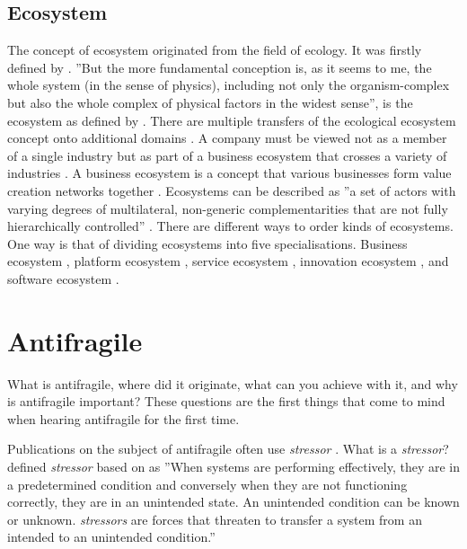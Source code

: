 \subsection{Ecosystem}
\label{sub:tbecosystem}
The concept of ecosystem originated from the field of ecology. It was firstly defined by \textcite[p.~229]{Tansley1935} \parencite[p.~19]{Rich1988}. ''But the more fundamental conception is, as it seems to me, the whole system (in the sense of physics), including not only the organism-complex but also the whole complex of physical factors in the widest sense'', is the ecosystem as defined by \textcite[p.~299]{Tansley1935}. There are multiple transfers of the ecological ecosystem concept onto additional domains \parencite[p.~3]{Guggenberger2020}. A company must be viewed not as a member of a single industry but as part of a business ecosystem that crosses a variety of industries \parencite[p.~76]{Moore1993}. A business ecosystem is a concept that various businesses form value creation networks together \parencite[p.~3]{Guggenberger2020}. Ecosystems can be described as ''a set of actors with varying degrees of multilateral, non-generic complementarities that are not fully hierarchically controlled'' \parencite[p.~2255]{Jacobides2018}. There are different ways to order kinds of ecosystems. One way is that of dividing ecosystems into five specialisations. Business ecosystem \parencite[p.~76]{Moore1993}, platform ecosystem \parencite[p.~5]{Guggenberger2020}, service ecosystem \parencites{Barros2006}{Papazoglou2006}{Huang2014}, innovation ecosystem \parencites{Iansiti2004}{Carayannis2009}{Gomes2018}, and software ecosystem \parencites{Manikas2013}[p.~5]{Guggenberger2020}.

\section{Antifragile}
\label{sec:tbantifragile}
What is \gls{antifragile}, where did it originate, what can you achieve with it, and why is \gls{antifragile} important? These questions are the first things that come to mind when hearing \gls{antifragile} for the first time.

Publications on the subject of \gls{antifragile} often use \textit{\gls{stressor}} \parencite[p.~32]{Botjes2020}. What is a \textit{\gls{stressor}}? \textcite[p.~23]{Ghasemi2017} defined \textit{\gls{stressor}} based on \textcites{TurnerII2003}{Chrousos2009} as ''When systems are performing effectively, they are in a predetermined condition and conversely when they are not functioning correctly, they are in an unintended state. An unintended condition can be known or unknown. \textit{\Glspl{stressor}} are forces that threaten to transfer a system from an intended to an unintended condition.''

